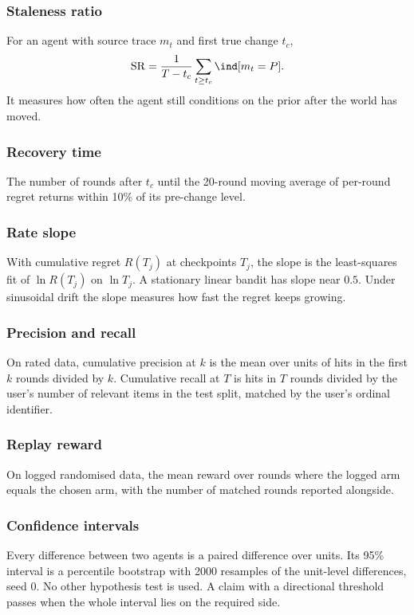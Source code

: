 \subsubsection*{Staleness ratio}
For an agent with source trace $m_t$ and first true change $t_c$,
\begin{equation}
\mathrm{SR}=\frac{1}{T-t_c}\sum_{t\ge t_c}\ind[m_t=P].
\label{eq:stale}
\end{equation}
It measures how often the agent still conditions on the prior after the world has moved.

\subsubsection*{Recovery time}
The number of rounds after $t_c$ until the 20-round moving average of per-round regret returns within 10\% of its pre-change level.

\subsubsection*{Rate slope}
With cumulative regret $R(T_j)$ at checkpoints $T_j$, the slope is the least-squares fit of $\ln R(T_j)$ on $\ln T_j$. A stationary linear bandit has slope near $0.5$. Under sinusoidal drift the slope measures how fast the regret keeps growing.

\subsubsection*{Precision and recall}
On rated data, cumulative precision at $k$ is the mean over units of hits in the first $k$ rounds divided by $k$. Cumulative recall at $T$ is hits in $T$ rounds divided by the user's number of relevant items in the test split, matched by the user's ordinal identifier.

\subsubsection*{Replay reward}
On logged randomised data, the mean reward over rounds where the logged arm equals the chosen arm, with the number of matched rounds reported alongside.

\subsubsection*{Confidence intervals}
Every difference between two agents is a paired difference over units. Its 95\% interval is a percentile bootstrap with 2000 resamples of the unit-level differences, seed 0. No other hypothesis test is used. A claim with a directional threshold passes when the whole interval lies on the required side.

